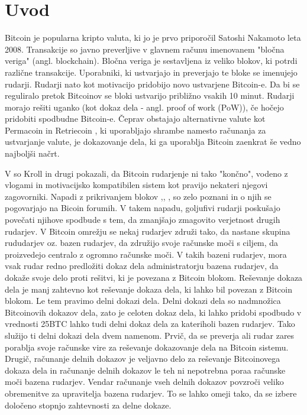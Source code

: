 \documentclass[12pt]{article}
\begin{document}
\section{Uvod}
Bitcoin je popularna kripto valuta, ki jo je prvo priporočil Satoshi Nakamoto \cite{nakamoto} leta 2008. Transakcije so javno preverljive v glavnem računu imenovanem "bločna veriga" (angl. blockchain). Bločna veriga je sestavljena iz veliko blokov, ki potrdi različne transakcije. Uporabniki, ki ustvarjajo in preverjajo te bloke se imenujejo rudarji. Rudarji nato kot motivacijo pridobijo novo ustvarjene Bitcoin-e. Da bi se reguliralo pretok Bitcoinov se bloki ustvarijo približno vsakih 10 minut. Rudarji morajo rešiti uganko (kot dokaz dela - angl. proof of work (PoW)), če hočejo pridobiti spodbudne Bitcoin-e. Čeprav obstajajo alternativne valute kot Permacoin \cite{permacoin} in Retriecoin \cite{retriecoin}, ki uporabljajo shrambe namesto računanja za ustvarjanje valute, je dokazovanje dela, ki ga uporablja Bitcoin zaenkrat še vedno najboljši načrt. 

 V \cite{economicsofbitcoin} so Kroll  in drugi pokazali, da Bitcoin rudarjenje ni tako "končno", vodeno z vlogami in motivacijsko kompatibilen sistem kot pravijo nekateri njegovi zagovorniki. Napadi z prikrivanjem blokov \cite{analysisofbitcoin},\cite{financialcryptography}, \cite{minnersdilemma}, \cite{powersplitting} so zelo poznani in o njih se pogovarjajo na Bicoin forumih. V takem napadu, goljufivi rudarji poskušajo povečati njihove spodbude s tem, da zmanjšajo zmagovito verjetnost drugih rudarjev. V Bitcoin omrežju se nekaj rudarjev združi tako, da nastane skupina rududarjev oz. bazen rudarjev, da združijo svoje računske moči s ciljem, da proizvedejo centralo z ogromno računske moči. V takih bazeni rudarjev, mora vsak rudar redno predložiti dokaz dela administratorju bazena rudarjev, da dokaže svoje delo proti rešitvi, ki je povezana z Bitcoin blokom. Reševanje dokaza dela je manj zahtevno kot reševanje dokaza dela, ki lahko bil povezan z Bitcoin blokom. Le tem pravimo delni dokazi dela. Delni dokazi dela so nadmnožica Bitcoinovih dokazov dela, zato je celoten dokaz dela, ki lahko pridobi spodbudo v vrednosti 25BTC lahko tudi delni dokaz dela za kateriholi bazen rudarjev. Tako  služijo ti delni dokazi dela dvem namenom. Prvič, da se preverja ali rudar zares porablja svoje računske vire za reševanje dokazovanje dela na Bitcoin sistemu. Drugič, računanje delnih dokazov je veljavno delo za reševanje Bitcoinovega dokaza dela in računanje delnih dokazov le teh ni nepotrebna poraa računske moči bazena rudarjev. Vendar računanje vseh delnih dokazov povzroči veliko obremenitve za upravitelja bazena rudarjev. To se lahko omeji tako, da se izbere določeno stopnjo zahtevnosti za delne dokaze.
\end{document}
